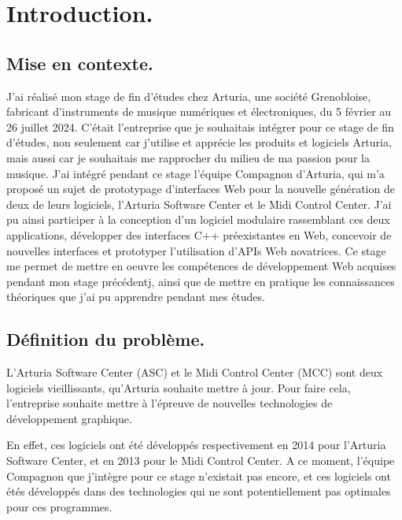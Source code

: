 \documentclass[francais]{rapportPFE}  %
\begin{document}



     
     
     
\section{Introduction.}

\subsection{Mise en contexte.}
J'ai réalisé mon stage de fin d'études chez Arturia, une société Grenobloise, fabricant d'instruments de musique numériques et électroniques, du 5 février au 26 juillet 2024. C'était l'entreprise que je souhaitais intégrer pour ce stage de fin d'études, non seulement car j'utilise et apprécie les produits et logiciels Arturia, mais aussi car je souhaitais me rapprocher du milieu de ma passion pour la musique. 
J'ai intégré pendant ce stage l'équipe Compagnon d'Arturia, qui m'a proposé un sujet de prototypage d'interfaces Web pour la nouvelle génération de deux de leurs logiciels, l'Arturia Software Center et le Midi Control Center. J'ai pu ainsi participer à la conception d'un logiciel modulaire rassemblant ces deux applications, développer des interfaces C++ préexistantes en Web, concevoir de nouvelles interfaces et prototyper l'utilisation d'APIs Web novatrices. Ce stage me permet de mettre en oeuvre les compétences de développement Web acquises pendant mon stage précédentj, ainsi que de mettre en pratique les connaissances théoriques que j'ai pu apprendre pendant mes études.
\subsection{Définition du problème.}

L'Arturia Software Center (ASC) et le Midi Control Center (MCC) sont deux logiciels vieillissants, qu'Arturia souhaite mettre à jour. Pour faire cela, l'entreprise souhaite mettre à l'épreuve de nouvelles technologies de développement graphique.

En effet, ces logiciels ont été développés respectivement en 2014 pour l'Arturia Software Center, et en 2013 pour le Midi Control Center. A ce moment, l'équipe Compagnon que j'intègre pour ce stage n'existait pas encore, et ces logiciels ont étés développés dans des technologies qui ne sont potentiellement pas optimales pour ces programmes.
\end{document}
